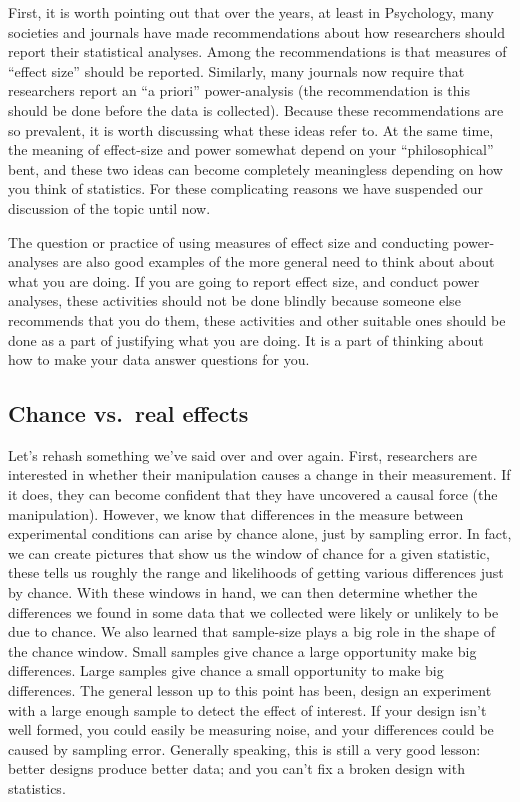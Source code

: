 \documentclass[
]{book}
\begin{document}
First, it is worth pointing out that over the years, at least in Psychology, many societies and journals have made recommendations about how researchers should report their statistical analyses. Among the recommendations is that measures of ``effect size'' should be reported. Similarly, many journals now require that researchers report an ``a priori'' power-analysis (the recommendation is this should be done before the data is collected). Because these recommendations are so prevalent, it is worth discussing what these ideas refer to. At the same time, the meaning of effect-size and power somewhat depend on your ``philosophical'' bent, and these two ideas can become completely meaningless depending on how you think of statistics. For these complicating reasons we have suspended our discussion of the topic until now.

The question or practice of using measures of effect size and conducting power-analyses are also good examples of the more general need to think about about what you are doing. If you are going to report effect size, and conduct power analyses, these activities should not be done blindly because someone else recommends that you do them, these activities and other suitable ones should be done as a part of justifying what you are doing. It is a part of thinking about how to make your data answer questions for you.

\subsection{Chance vs.~real effects}\label{chance-vs.-real-effects}

Let's rehash something we've said over and over again. First, researchers are interested in whether their manipulation causes a change in their measurement. If it does, they can become confident that they have uncovered a causal force (the manipulation). However, we know that differences in the measure between experimental conditions can arise by chance alone, just by sampling error. In fact, we can create pictures that show us the window of chance for a given statistic, these tells us roughly the range and likelihoods of getting various differences just by chance. With these windows in hand, we can then determine whether the differences we found in some data that we collected were likely or unlikely to be due to chance. We also learned that sample-size plays a big role in the shape of the chance window. Small samples give chance a large opportunity make big differences. Large samples give chance a small opportunity to make big differences. The general lesson up to this point has been, design an experiment with a large enough sample to detect the effect of interest. If your design isn't well formed, you could easily be measuring noise, and your differences could be caused by sampling error. Generally speaking, this is still a very good lesson: better designs produce better data; and you can't fix a broken design with statistics.
\end{document}
